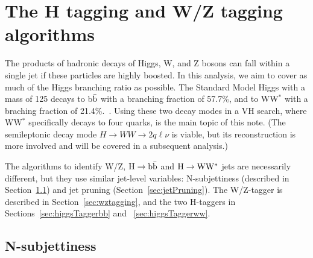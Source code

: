 \section{The H tagging and W/Z tagging algorithms}
\label{sec: H tagging}

The products of hadronic decays of Higgs, W, and Z bosons can fall
within a single jet if these particles are highly boosted.  In this
analysis, we aim to cover as much of the Higgs branching ratio as
possible.  The Standard Model Higgs with a mass of 125 \GeVcc decays
to b$\bar{\rm b}$ with a branching fraction of 57.7\%, and to WW$^*$
with a braching fraction of 21.4\%.~\cite{pdg-higgs}.  Using these two
decay modes in a VH search, where WW$^*$ specifically decays to four
quarks, is the main topic of this note.  (The semileptonic decay mode
$ H \to WW \to 2q\ell \nu$ is viable, but its reconstruction is more
involved and will be covered in a subsequent analysis.)



The algorithms to identify W/Z, ${\rm H \to b\bar{b}}$ and 
${\rm H \to WW^*}$ jets are necessarily different, but they use similar
jet-level variables: N-subjettiness (described in
Section~\ref{sec:N-subjettiness}) and jet pruning
(Section~\ref{sec:jetPruning}).  The W/Z-tagger is described in
Section~\ref{sec:wztagging}, and the two H-taggers in
Sections~\ref{sec:higgsTaggerbb} and ~\ref{sec:higgsTaggerww}.



\subsection{N-subjettiness}
\label{sec:N-subjettiness}

